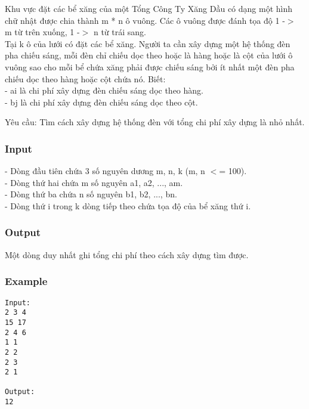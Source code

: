 



   Khu vực đặt các bể xăng của một Tổng Công Ty Xăng Dầu có dạng một hình chữ nhật được chia thành m * n ô vuông. Các ô vuông được đánh tọa độ 1 -$>$ m từ trên xuống, 1 -$>$ n từ trái sang.   
\\   Tại k ô của lưới có đặt các bể xăng. Người ta cần xây dựng một hệ thống đèn pha chiếu sáng, mỗi đèn chỉ chiếu dọc theo hoặc là hàng hoặc là cột của lưới ô vuông sao cho mỗi bể chứa xăng phải được chiếu sáng bởi ít nhất một đèn pha chiếu dọc theo hàng hoặc cột chứa nó. Biết:   
\\   - ai là chi phí xây dựng đèn chiếu sáng dọc theo hàng.   
\\   - bj là chi phí xây dựng đèn chiếu sáng dọc theo cột.  

       Yêu cầu:      Tìm cách xây dựng hệ thống đèn với tổng chi phí xây dựng là nhỏ nhất.  

\subsubsection{   Input  }

   - Dòng đầu tiên chứa 3 số nguyên dương m, n, k (m, n $<$= 100).   
\\   - Dòng thứ hai chứa m số nguyên a1, a2, ..., am.   
\\   - Dòng thứ ba chứa n số nguyên b1, b2, ..., bn.   
\\   - Dòng thứ i trong k dòng tiếp theo chứa tọa độ của bể xăng thứ i.  

\subsubsection{   Output  }

   Một dòng duy nhất ghi tổng chi phí theo cách xây dựng tìm được.  

\subsubsection{   Example  }
\begin{verbatim}
Input:
2 3 4
15 17
2 4 6
1 1
2 2
2 3
2 1

Output:
12
\end{verbatim}